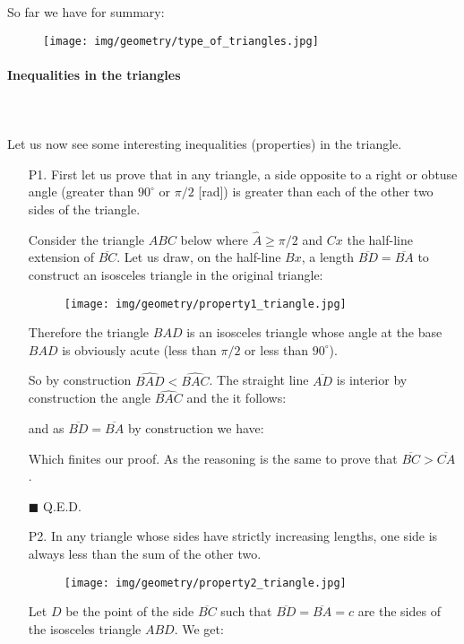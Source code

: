 	So far we have for summary:
	\begin{figure}[H]
		\centering
		\texttt{[image: img/geometry/type\_of\_triangles.jpg]}
	\end{figure}
	
	\pagebreak
	\paragraph{Inequalities in the triangles}\mbox{}\\\\
	Let us now see some interesting inequalities (properties) in the triangle.
	\begin{enumerate}
		\item[P1.] First let us prove that in any triangle, a side opposite to a right or obtuse angle (greater than $90^\circ$ or $\pi/2$ [rad]) is greater than each of the other two sides of the triangle.

		\begin{dem}
		Consider the triangle $ABC$ below where $\hat{A}\geq \pi/2$ and $Cx$ the half-line extension of $\overline{BC}$. Let us draw, on the half-line $Bx$, a length $\overline{BD}=\overline{BA}$ to construct an isosceles triangle in the original triangle:
		\begin{figure}[H]
			\centering
			\texttt{[image: img/geometry/property1\_triangle.jpg]}
		\end{figure}
		Therefore the triangle $BAD$ is an isosceles triangle whose angle at the base $BAD$ is obviously acute (less than $\pi/2$ or less than $90^\circ$).
		
		So by construction $\widehat{BAD}<\widehat{BAC}$. The straight line $\overline{AD}$ is interior by construction the angle $\widehat{BAC}$ and the it follows:
		
		and as $\overline{BD}=\overline{BA}$ by construction we have:
		
		Which finites our proof. As the reasoning is the same to prove that $\overline{BC}>\overline{CA}$.
		\begin{flushright}
			$\blacksquare$  Q.E.D.
		\end{flushright}
		\end{dem}

		\item[P2.] In any triangle whose sides have strictly increasing lengths, one side is always less than the sum of the other two.
		\begin{figure}[H]
			\centering
			\texttt{[image: img/geometry/property2\_triangle.jpg]}
		\end{figure}
		\begin{dem}
		Let $D$ be the point of the side $\overline{BC}$ such that $\overline{BD}=\overline{BA}=c$ are the sides of the isosceles triangle $ABD$. We get:
		

\end{dem}
\end{enumerate}
